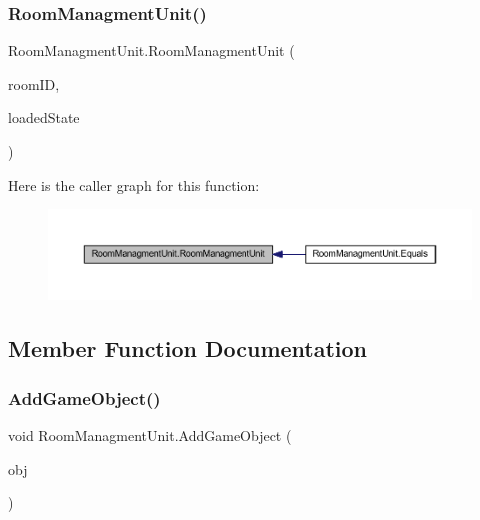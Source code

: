 \subsubsection{\texorpdfstring{Room\+Managment\+Unit()}{RoomManagmentUnit()}}
{\footnotesize\ttfamily Room\+Managment\+Unit.\+Room\+Managment\+Unit (\begin{DoxyParamCaption}\item[{uint}]{room\+ID,  }\item[{bool}]{loaded\+State }\end{DoxyParamCaption})}

Here is the caller graph for this function\+:
\nopagebreak
\begin{figure}[H]
\begin{center}
\leavevmode
\includegraphics[width=350pt]{class_room_managment_unit_ad9c4cf6c496f32f6e0edbe47a4bf0295_icgraph}
\end{center}
\end{figure}


\subsection{Member Function Documentation}
\mbox{\label{class_room_managment_unit_ac7f3f62eb0e6f9f0bb239266796a323a}} 
\subsubsection{\texorpdfstring{Add\+Game\+Object()}{AddGameObject()}}
{\footnotesize\ttfamily void Room\+Managment\+Unit.\+Add\+Game\+Object (\begin{DoxyParamCaption}\item[{Game\+Object}]{obj }\end{DoxyParamCaption})}

